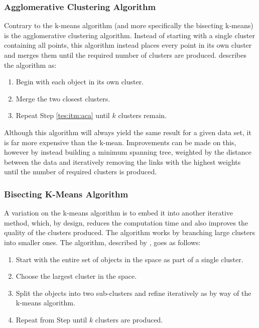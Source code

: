 \subsubsection{Agglomerative Clustering Algorithm}
Contrary to the k-means algorithm (and more specifically the bisecting k-means) is the agglomerative clustering algorithm. Instead of starting with a single cluster containing all points, this algorithm instead places every point in its own cluster and merges them until the required number of clusters are produced. \citet{way2012advances} describes the algorithm as:
\begin{enumerate}
  \item Begin with each object in its own cluster.
  \item\label{tes:itm:aca} Merge the two closest clusters.
  \item Repeat Step \ref{tes:itm:aca} until $k$ clusters remain.
\end{enumerate}
Although this algorithm will always yield the same result for a given data set, it is far more expensive than the k-mean. Improvements can be made on this, however by instead building a minimum spanning tree, weighted by the distance between the data and iteratively removing the links with the highest weights until the number of required clusters is produced.
%
\subsubsection{Bisecting K-Means Algorithm}\label{tes:ssec:bkma}
A variation on the k-means algorithm is to embed it into another iterative method, which, by design, reduces the computation time and also improves the quality of the clusters produced. The algorithm works by branching large clusters into smaller ones. The algorithm, described by \citet{steinbach2000comparison}, goes as follows:
\begin{enumerate}
  \item Start with the entire set of objects in the space as part of a single cluster.
  \item\label{tes:itm:bkm} Choose the largest cluster in the space.
  \item Split the objects into two sub-clusters and refine iteratively as by way of the k-means algorithm.
  \item Repeat from Step \label{tes:itm:bka} until $k$ clusters are produced.
\end{enumerate}
